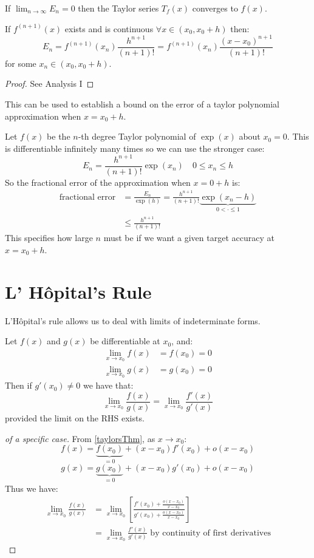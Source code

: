 \documentclass[../main.tex]{subfiles}
\begin{document}
If $\lim_{n \to \infty} E_n = 0$ then the Taylor series $T_f(x)$ converges to $f(x)$.

\begin{theorem}
If $f^{(n+1)}(x)$ exists and is continuous $\forall x \in (x_0, x_0 + h)$ then:
\[
  E_n = f^{(n+1)}(x_n) \frac{h^{n+1}}{(n+1)!} = f^{(n + 1)}(x_n)\frac{(x - x_0)^{n + 1}}{(n + 1)!}
\]
for some $x_n \in (x_0, x_0 + h)$.
\end{theorem}
\begin{proof}
  See Analysis I
\end{proof}

This can be used to establish a bound on the error of a taylor polynomial approximation when $x = x_0 + h$.
\begin{example}
  Let $f(x)$ be the $n$-th degree Taylor polynomial of $\exp(x)$ about $x_0 = 0$.
  This is differentiable infinitely many times so we can use the stronger case:
  \[
    E_n = \frac{h^{n + 1}}{(n + 1)!}\exp(x_n)\quad 0 \leq x_n \leq h
  \]
  So the fractional error of the approximation when $x = 0 + h$ is:
  \begin{align*}
    \text{fractional error} &= \frac{E_n}{\exp(h)} = \frac{h^{n+1}}{(n+1)!}\underbrace{\exp(x_n - h)}_{0 < \cdot \leq 1} \\
                            &\leq \frac{h^{n + 1}}{(n + 1)!}
  \end{align*}
  This specifies how large $n$ must be if we want a given target accuracy at $x = x_0 + h$.
\end{example}
\section{L' H\^opital's Rule}
L'H\^opital's rule allows us to deal with limits of indeterminate forms.
\begin{theorem}
  Let $f(x)$ and $g(x)$ be differentiable at $x_0$, and:
  \begin{align*}
    \lim_{x \to x_0} f(x) &= f(x_0) = 0 \\
    \lim_{x \to x_0} g(x) &= g(x_0) = 0
  \end{align*}
  Then if $g'(x_0) \neq 0$ we have that:
  \[
    \lim_{x \to x_0} \frac{f(x)}{g(x)} = \lim_{x \to x_0} \frac{f'(x)}{g'(x)}
  \]
  provided the limit on the RHS exists.
\end{theorem}
\begin{proof}[of a specific case]
  From \cref{taylorsThm}, as $x \to x_0$:
  \[
    f(x) = \underbrace{f(x_0)}_{=0} + (x - x_0)f'(x_0) + o(x - x_0)
  \]
  \[
    g(x) = \underbrace{g(x_0)}_{=0} + (x - x_0)g'(x_0) + o(x - x_0)
  \]
  Thus we have:
  \begin{align*}
    \lim_{x \to x_0} \frac{f(x)}{g(x)} &= \lim_{x \to x_0} \left[\frac{f'(x_0) + \frac{o(x-x_0)}{x-x_0}}{g'(x_0) + \frac{o(x-x_0)}{x-x_0}}\right] \\
                                       &= \lim_{x \to x_0} \frac{f'(x)}{g'(x)} \text{ by continuity of first derivatives}
  \end{align*}
\end{proof}
\end{document}
